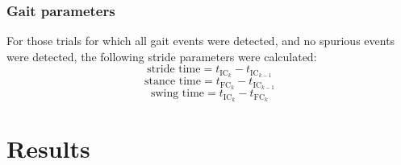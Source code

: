\documentclass[sensors,article,submit,pdftex,moreauthors]{Definitions/mdpi}
\begin{document}
\subsubsection{Gait parameters}
For those trials for which all gait events were detected, and no spurious events were detected, the following stride parameters were calculated:
\begin{equation}
	\textrm{stride time} = t_{\textrm{IC}_{k}} - t_{\textrm{IC}_{k-1}}
	\label{eqn:stride_time}
\end{equation}
\begin{equation}
	\textrm{stance time} = t_{\textrm{FC}_{k}} - t_{\textrm{IC}_{k-1}}
	\label{eqn:stance_time}
\end{equation}
\begin{equation}
	\textrm{swing time} = t_{\textrm{IC}_{k}} - t_{\textrm{FC}_{k}}
	\label{eqn:swing_time}
\end{equation}

\section{Results}
\end{document}
